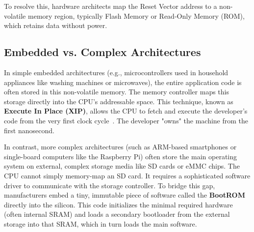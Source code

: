 \documentclass[a4paper,10pt,twoside]{report}
\theoremstyle{definition}
\begin{document}
To resolve this, hardware architects map the Reset Vector address to a non-volatile memory region, typically Flash Memory or Read-Only Memory (ROM), which retains data without power.

\subsection{Embedded vs. Complex Architectures}
In simple embedded architectures (e.g., microcontrollers used in household appliances like washing machines or microwaves), the entire application code is often stored in this non-volatile memory. The memory controller maps this storage directly into the CPU's addressable space. This technique, known as \textbf{Execute In Place (XIP)}, allows the CPU to fetch and execute the developer's code from the very first clock cycle~\cite{ARM-CortexM4-Generic-User-Guide}. The developer "owns" the machine from the first nanosecond.

In contrast, more complex architectures (such as ARM-based smartphones or single-board computers like the Raspberry Pi) often store the main operating system on external, complex storage media like SD cards or eMMC chips. The CPU cannot simply memory-map an SD card. It requires a sophisticated software driver to communicate with the storage controller. To bridge this gap, manufacturers embed a tiny, immutable piece of software called the \textbf{BootROM} directly into the silicon. This code initializes the minimal required hardware (often internal SRAM) and loads a secondary bootloader from the external storage into that SRAM, which in turn loads the main software.
\end{document}

